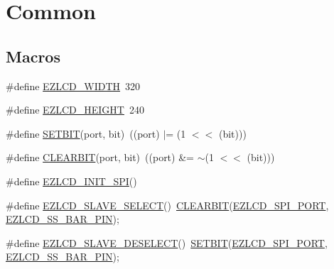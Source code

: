 \hypertarget{group__ez_l_c_d__103__common}{\section{Common}
\label{group__ez_l_c_d__103__common}
}
\subsection*{Macros}
\begin{DoxyCompactItemize}
\item 
\#define \hyperlink{group__ez_l_c_d__103__common_ga7160333b021def2426e7a37374e0237e}{E\-Z\-L\-C\-D\-\_\-\-W\-I\-D\-T\-H}~320
\item 
\#define \hyperlink{group__ez_l_c_d__103__common_ga80fd71095e0770e3946dd9a8bc997342}{E\-Z\-L\-C\-D\-\_\-\-H\-E\-I\-G\-H\-T}~240
\item 
\#define \hyperlink{group__ez_l_c_d__103__common_ga62e58ee0221736142ba2ff8cacafdb9f}{S\-E\-T\-B\-I\-T}(port, bit)~((port) $|$= (1 $<$$<$ (bit)))
\item 
\#define \hyperlink{group__ez_l_c_d__103__common_ga8826ffc761710e6313c4c3e3188bfc13}{C\-L\-E\-A\-R\-B\-I\-T}(port, bit)~((port) \&= $\sim$(1 $<$$<$ (bit)))
\item 
\#define \hyperlink{group__ez_l_c_d__103__common_gaf5c3b2dedc950d34e0381946fbb32428}{E\-Z\-L\-C\-D\-\_\-\-I\-N\-I\-T\-\_\-\-S\-P\-I}()
\item 
\#define \hyperlink{group__ez_l_c_d__103__common_ga44c44ce98f7be19a71fd5a2512f7defe}{E\-Z\-L\-C\-D\-\_\-\-S\-L\-A\-V\-E\-\_\-\-S\-E\-L\-E\-C\-T}()~\hyperlink{group__ez_l_c_d__103__common_ga8826ffc761710e6313c4c3e3188bfc13}{C\-L\-E\-A\-R\-B\-I\-T}(\hyperlink{group__ez_l_c_d__103__user__config_ga4be156c889cb0fd12e44107a54d212ec}{E\-Z\-L\-C\-D\-\_\-\-S\-P\-I\-\_\-\-P\-O\-R\-T}, \hyperlink{group__ez_l_c_d__103__user__config_gaa5185668bf24c5de3067f78960330117}{E\-Z\-L\-C\-D\-\_\-\-S\-S\-\_\-\-B\-A\-R\-\_\-\-P\-I\-N});
\item 
\#define \hyperlink{group__ez_l_c_d__103__common_gad6fbc948d09f441af9a8b3d5df4b0629}{E\-Z\-L\-C\-D\-\_\-\-S\-L\-A\-V\-E\-\_\-\-D\-E\-S\-E\-L\-E\-C\-T}()~\hyperlink{group__ez_l_c_d__103__common_ga62e58ee0221736142ba2ff8cacafdb9f}{S\-E\-T\-B\-I\-T}(\hyperlink{group__ez_l_c_d__103__user__config_ga4be156c889cb0fd12e44107a54d212ec}{E\-Z\-L\-C\-D\-\_\-\-S\-P\-I\-\_\-\-P\-O\-R\-T}, \hyperlink{group__ez_l_c_d__103__user__config_gaa5185668bf24c5de3067f78960330117}{E\-Z\-L\-C\-D\-\_\-\-S\-S\-\_\-\-B\-A\-R\-\_\-\-P\-I\-N});
\end{DoxyCompactItemize}
